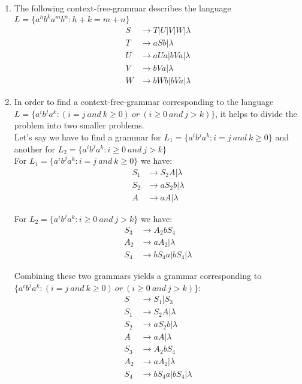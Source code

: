 \begin{enumerate}[label={(\alph*)}]
    \item The following context-free-grammar describes the language $L = \{a^h b^k a^m b^n : h + k = m + n\}$
    \begin{align*}
        S &\rightarrow T | U | V |W|\lambda\\
        T &\rightarrow aSb | \lambda\\
        U &\rightarrow aUa | bVa | \lambda\\
        V &\rightarrow bVa | \lambda\\
        W &\rightarrow bWb | bVa | \lambda
    \end{align*}
    
    \item 
    \noindent In order to find a context-free-grammar corresponding to the language $L = \{a^i b^j a^k : (i = j \: and \: k \geq 0) \: or \: (i \geq 0 \: and \: j > k)\}$, it helps to divide the problem into two smaller problems.\\ Let's say we have to find a grammar for $L_1 = \{a^i b^j a^k : i = j \: and \: k \geq 0\}$ and another for $L_2 = \{a^i b^j a^k : i \geq 0 \: and \: j > k\}$\\
    \noindent For $L_1 = \{a^i b^j a^k : i = j \: and \: k \geq 0\}$ we have:
    \begin{align*}
        S_1 &\rightarrow S_2A | \lambda\\
        S_2 &\rightarrow aS_2b | \lambda\\
        A &\rightarrow aA | \lambda
    \end{align*}
    
    \noindent For $L_2 = \{a^i b^j a^k : i \geq 0 \: and \: j > k\}$ we have:
    \begin{align*}
        S_3 &\rightarrow A_2bS_4\\
        A_2 &\rightarrow aA_2 | \lambda\\
        S_4 &\rightarrow bS_4a | bS_4 | \lambda
    \end{align*}
    
    \noindent Combining these two grammars yields a grammar corresponding to $\{a^i b^j a^k : (i = j \: and \: k \geq 0) \: or \: (i \geq 0 \: and \: j > k)\}$:
    \begin{align*}
        S &\rightarrow S_1|S_3\\
        S_1 &\rightarrow S_2A | \lambda\\
        S_2 &\rightarrow aS_2b | \lambda\\
        A &\rightarrow aA | \lambda\\
        S_3 &\rightarrow A_2bS_4\\
        A_2 &\rightarrow aA_2 | \lambda\\
        S_4 &\rightarrow bS_4a | bS_4 | \lambda
    \end{align*}
    
    
    
\end{enumerate}